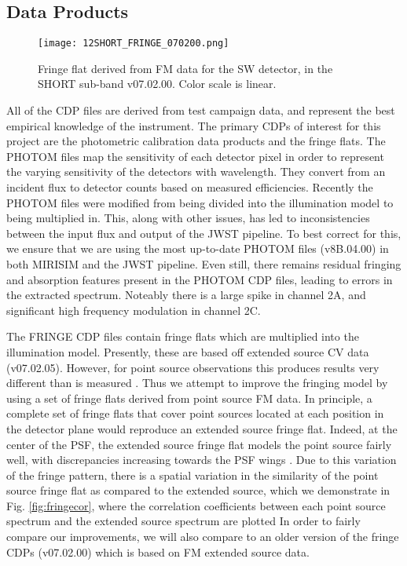 \subsection{Data Products}
\begin{wrapfigure}{r}{5.5cm}
	\vspace{-1em}
	\centering
	\texttt{[image: 12SHORT\_FRINGE\_070200.png]}
	\caption{Fringe flat derived from FM data for the SW detector, in the SHORT sub-band v07.02.00. Color scale is linear.}
	\label{fig:fringeflat}
	\vspace{-2em}
\end{wrapfigure}
All of the CDP files are derived from test campaign data, and represent the best empirical knowledge of the instrument.
The primary CDPs of interest for this project are the photometric calibration data products and the fringe flats.
The PHOTOM files map the sensitivity of each detector pixel in order to represent the varying sensitivity of the detectors with wavelength. 
They convert from an incident flux to detector counts based on measured efficiencies.
Recently the PHOTOM files were modified from being divided into the illumination model to being multiplied in. 
This, along with other issues, has led to inconsistencies between the input flux and output of the JWST pipeline.
To best correct for this, we ensure that we are using the most up-to-date PHOTOM files (v8B.04.00) in both MIRISIM and the JWST pipeline.
Even still, there remains residual fringing and absorption features present in the PHOTOM CDP files, leading to errors in the extracted spectrum.
Noteably there is a large spike in channel 2A, and significant high frequency modulation in channel 2C.

The FRINGE CDP files contain fringe flats which are multiplied into the illumination model. 
Presently, these are based off extended source CV data (v07.02.05).
However, for point source observations this produces results very different than is measured \parencite{Argyriou2018a}.
Thus we attempt to improve the fringing model by using a set of fringe flats derived from point source FM data. 
In principle, a complete set of fringe flats that cover point sources located at each position in the detector plane would reproduce an extended source fringe flat.
Indeed, at the center of the PSF, the extended source fringe flat models the point source fairly well, with discrepancies increasing towards the PSF wings \parencite{Argyriou2020}.
Due to this variation of the fringe pattern, there is a spatial variation in the similarity of the point source fringe flat as compared to the extended source, which we demonstrate in Fig. \ref{fig:fringecor}, where the correlation coefficients between each point source spectrum and the extended source spectrum are plotted
In order to fairly compare our improvements, we will also compare to an older version of the fringe CDPs (v07.02.00) which is based on FM extended source data.

